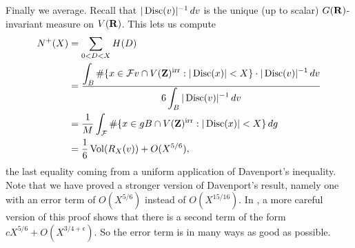 Finally we average. Recall that $|\operatorname{Disc}(v)|^{-1}\, dv$ is the unique 
(up to scalar) $G(\mathbf{R})$-invariant measure on $V(\mathbf{R})$. This lets us compute  
\begin{align*}
  N^+(X) 
    &= \sum_{0<D<X} H(D) \\
    &= \frac{\displaystyle\int_B \#\{x\in \mathcal{F} v\cap V(\mathbf{Z})^{\mathrm{irr}}:|\operatorname{Disc}(x)|<X\}\cdot |\operatorname{Disc}(v)|^{-1}\, dv}{6\displaystyle\int_B|\operatorname{Disc}(v)|^{-1}\, dv} \\
    &= \frac{1}{M} \int_{\mathcal{F}}\#\{x\in g B\cap V(\mathbf{Z})^{\mathrm{irr}}:|\operatorname{Disc}(x)|<X\}\, dg \\
    &= \frac 1 6 \operatorname{Vol}(R_X(v)) + O(X^{5/6}) ,
\end{align*}
the last equality coming from a uniform application of Davenport's inequality. 
Note that we have proved a stronger version of Davenport's result, namely one 
with an error term of $O(X^{5/6})$ instead of $O(X^{15/16})$. In \cite{bst13}, 
a more careful version of this proof shows that there is a second term of the 
form $c X^{5/6}+O(X^{3/4+\epsilon})$. So the error term is in many ways as good 
as possible. 




